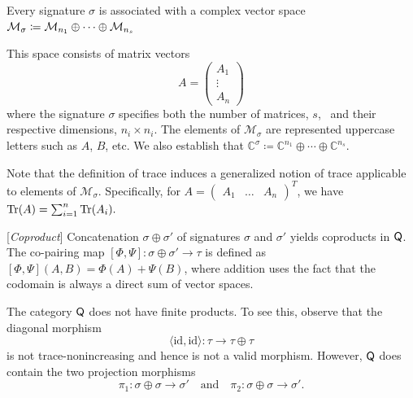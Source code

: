 
Every signature $\sigma$ is associated with a complex vector space   
$\mathcal{M}_\sigma \coloneqq \mathcal{M}_{n_1} \oplus \cdots \oplus \mathcal{M}_{n_s}$

This space consists of matrix vectors 
$$A = \begin{pmatrix} A_1 \\ \vdots \\ A_n \end{pmatrix}$$
where the signature $\sigma$ specifies both the number of matrices, $s$,  and their respective dimensions, $n_i \times n_i$. The elements of $\mathcal{M}_\sigma$ are represented uppercase letters such as $A$, $B$, etc.
We also establish that $\mathbb{C}^\sigma \coloneqq \mathbb{C}^{n_1} \oplus \cdots \oplus \mathbb{C}^{n_s}$.

Note that the definition of trace induces a generalized notion of trace applicable to elements of $\mathcal{M}_\sigma$. Specifically, for $A = \begin{pmatrix} A_1 & \ldots & A_n \end{pmatrix}^T$, we have $\text{Tr}(A) = \sum_{i=1}^n \text{Tr}(A_i).$
 

\begin{definition} \label{def:biproduct} [\emph{Coproduct}]
Concatenation $ \sigma \oplus \sigma'$ of signatures $\sigma$ and $\sigma'$ yields coproducts in $\mathsf{Q}$. The co-pairing map $[\Phi, \Psi]: \sigma \oplus \sigma' \to \tau$ is defined as  $[\Phi, \Psi](A, B) = \Phi(A) + \Psi(B)$, where addition uses the fact that the codomain is always a direct sum of vector spaces.
\end{definition}

\begin{remark}
  The category $\mathsf{Q}$ does not have finite products. To see this, observe that the diagonal morphism 
\[
\langle \mathrm{id}, \mathrm{id} \rangle \colon \tau \to \tau \oplus \tau
\] 
is not trace-nonincreasing and hence is not a valid morphism. 
However, $\mathsf{Q}$ does contain the two projection morphisms 
\[
\pi_1 \colon \sigma \oplus \sigma \to \sigma' \quad \text{and} \quad \pi_2 \colon \sigma \oplus \sigma \to \sigma'.
\] 

\end{remark}

